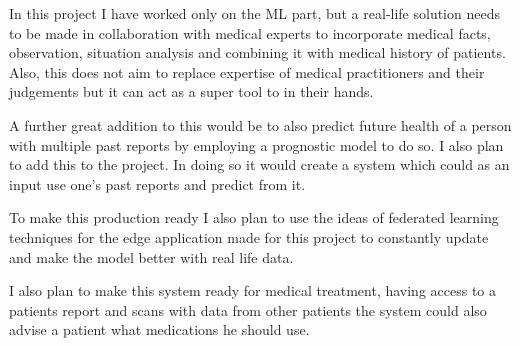 \documentclass[a4paper]{article}
\begin{document}
\qquad In this project I have worked only on the ML part, but a real-life solution needs to be made in collaboration with medical experts to incorporate medical facts, observation, situation analysis and combining it with medical history of patients. Also, this does not aim to replace expertise of medical practitioners and their judgements but it can act as a super tool to in their hands.

\qquad A further great addition to this would be to also predict future health of a person with multiple past reports by employing a prognostic model to do so. I also plan to add this to the project. In doing so it would create a system which could as an input use one's past reports and predict from it.

\qquad To make this production ready I also plan to use the ideas of federated learning techniques for the edge application made for this project to constantly update and make the model better with real life data.

\qquad I also plan to make this system ready for medical treatment, having access to a patients report and scans with data from other patients the system could also advise a patient what medications he should use.

\printbibliography
\end{document}
